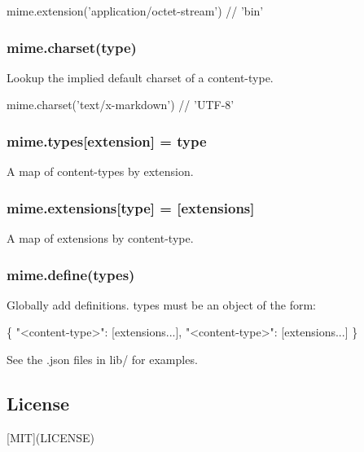 \begin{DoxyCode}
mime.extension(\textcolor{stringliteral}{'application/octet-stream'}) \textcolor{comment}{// 'bin'}
\end{DoxyCode}


\subsubsection*{mime.\+charset(type)}

Lookup the implied default charset of a content-\/type.


\begin{DoxyCode}
mime.charset(\textcolor{stringliteral}{'text/x-markdown'}) \textcolor{comment}{// 'UTF-8'}
\end{DoxyCode}


\subsubsection*{mime.\+types\mbox{[}extension\mbox{]} = type}

A map of content-\/types by extension.

\subsubsection*{mime.\+extensions\mbox{[}type\mbox{]} = \mbox{[}extensions\mbox{]}}

A map of extensions by content-\/type.

\subsubsection*{mime.\+define(types)}

Globally add definitions. {\ttfamily types} must be an object of the form\+:


\begin{DoxyCode}
\{
  \textcolor{stringliteral}{"<content-type>"}: [extensions...],
  \textcolor{stringliteral}{"<content-type>"}: [extensions...]
\}
\end{DoxyCode}


See the {\ttfamily .json} files in {\ttfamily lib/} for examples.

\subsection*{License}

\mbox{[}M\+I\+T\mbox{]}(L\+I\+C\+E\+N\+S\+E) 